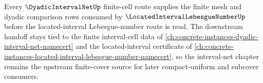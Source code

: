 Every $\DyadicIntervalNetUp$ finite-cell route supplies the finite mesh and dyadic comparison rows consumed by $\LocatedIntervalLebesgueNumberUp$ before the located-interval Lebesgue-number route is read. The downstream handoff stays tied to the finite interval-cell data of \autoref{ch:concrete-instances-dyadic-interval-net-namecert} and the located-interval certificate of \autoref{ch:concrete-instances-located-interval-lebesgue-number-namecert}, so the interval-net chapter remains the upstream finite-cover source for later compact-uniform and subcover consumers.
